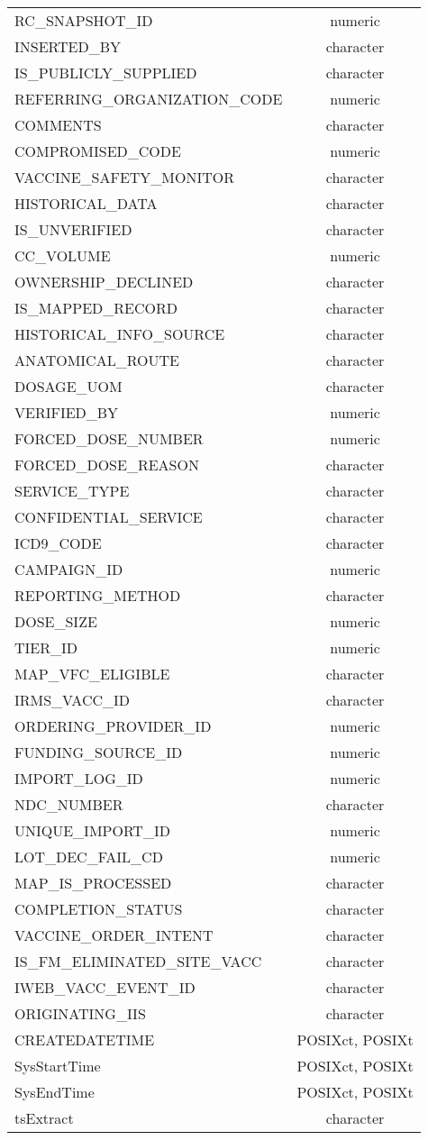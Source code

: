 \documentclass[
  letterpaper,
  DIV=11,
  numbers=noendperiod]{scrreprt}
\begin{document}
\begin{longtable}{lc}
RC\_SNAPSHOT\_ID & numeric \\ 
INSERTED\_BY & character \\ 
IS\_PUBLICLY\_SUPPLIED & character \\ 
REFERRING\_ORGANIZATION\_CODE & numeric \\ 
COMMENTS & character \\ 
COMPROMISED\_CODE & numeric \\ 
VACCINE\_SAFETY\_MONITOR & character \\ 
HISTORICAL\_DATA & character \\ 
IS\_UNVERIFIED & character \\ 
CC\_VOLUME & numeric \\ 
OWNERSHIP\_DECLINED & character \\ 
IS\_MAPPED\_RECORD & character \\ 
HISTORICAL\_INFO\_SOURCE & character \\ 
ANATOMICAL\_ROUTE & character \\ 
DOSAGE\_UOM & character \\ 
VERIFIED\_BY & numeric \\ 
FORCED\_DOSE\_NUMBER & numeric \\ 
FORCED\_DOSE\_REASON & character \\ 
SERVICE\_TYPE & character \\ 
CONFIDENTIAL\_SERVICE & character \\ 
ICD9\_CODE & character \\ 
CAMPAIGN\_ID & numeric \\ 
REPORTING\_METHOD & character \\ 
DOSE\_SIZE & numeric \\ 
TIER\_ID & numeric \\ 
MAP\_VFC\_ELIGIBLE & character \\ 
IRMS\_VACC\_ID & character \\ 
ORDERING\_PROVIDER\_ID & numeric \\ 
FUNDING\_SOURCE\_ID & numeric \\ 
IMPORT\_LOG\_ID & numeric \\ 
NDC\_NUMBER & character \\ 
UNIQUE\_IMPORT\_ID & numeric \\ 
LOT\_DEC\_FAIL\_CD & numeric \\ 
MAP\_IS\_PROCESSED & character \\ 
COMPLETION\_STATUS & character \\ 
VACCINE\_ORDER\_INTENT & character \\ 
IS\_FM\_ELIMINATED\_SITE\_VACC & character \\ 
IWEB\_VACC\_EVENT\_ID & character \\ 
ORIGINATING\_IIS & character \\ 
CREATEDATETIME & POSIXct, POSIXt \\ 
SysStartTime & POSIXct, POSIXt \\ 
SysEndTime & POSIXct, POSIXt \\ 
tsExtract & character \\ 
\bottomrule
\end{longtable}
\end{document}
